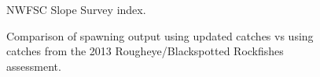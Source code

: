 \documentclass[
]{scrartcl}
\begin{document}
\begin{figure}[H]


\caption{\label{fig-NWFSC_Slope_index}NWFSC Slope Survey index.}

\end{figure}%

\begin{figure}[H]


\caption{\label{fig-Ct_compsSO}Comparison of spawning output using
updated catches vs using catches from the 2013 Rougheye/Blackspotted
Rockfishes assessment.}

\end{figure}%
\end{document}
